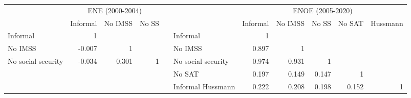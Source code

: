 \begin{tabular}{rrrrrl|rrrrr}
\cmidrule{1-4}\cmidrule{6-11}      & \multicolumn{3}{c}{ENE (2000-2004)} &       & \multicolumn{1}{r}{} & \multicolumn{5}{c}{ENOE (2005-2020)} \\
\cmidrule{2-4}\cmidrule{7-11}\multicolumn{1}{r|}{} & \multicolumn{1}{l}{Informal} & \multicolumn{1}{l}{No IMSS} & \multicolumn{1}{l}{No SS} &       &       & \multicolumn{1}{l}{Informal} & \multicolumn{1}{l}{No IMSS} & \multicolumn{1}{l}{No SS} & \multicolumn{1}{l}{No SAT} & \multicolumn{1}{l}{Hussmann} \\
\cmidrule{1-4}\cmidrule{6-11}\multicolumn{1}{l|}{Informal} & 1     &       &       &       & Informal & 1     &       &       &       &  \\
\multicolumn{1}{l|}{No IMSS} & -0.007 & 1     &       &       & No IMSS & 0.897 & 1     &       &       &  \\
\multicolumn{1}{l|}{No social security} & -0.034 & 0.301 & 1     &       & No social security & 0.974 & 0.931 & 1     &       &  \\
\cmidrule{1-4}      &       &       &       &       & No SAT & 0.197 & 0.149 & 0.147 & 1     &  \\
      &       &       &       &       & Informal Hussmann & 0.222 & 0.208 & 0.198 & 0.152 & 1 \\
\cmidrule{6-11}\end{tabular}%
